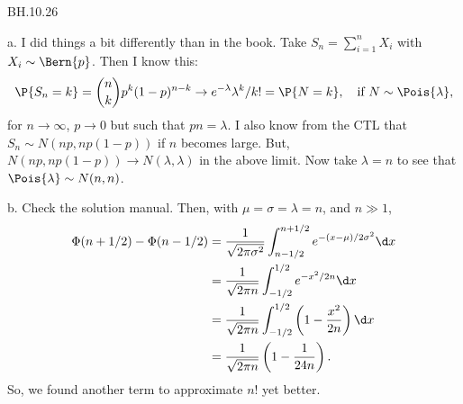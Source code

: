 
\setcounter{theorem}{25}
\begin{exercise} BH.10.26
\begin{solution}
a.
I did things a bit differently than in the book. Take $S_n=\sum_{i=1}^n X_i$ with $X_i\sim\Bern{p}$. Then I know this:
\begin{align*}
\P{S_n=k} = {n \choose k} p^k(1-p)^{n-k} \to e^{-\lambda} \lambda^k/k! = \P{N=k}, \quad\text{if } N\sim\Pois{\lambda},
\end{align*}
for $n\to \infty$, $p\to0$ but such that $p n = \lambda$.
I also know from the CTL that $S_n\sim N(n p, n p(1-p))$ if $n$ becomes large.
But, $N(n p, n p(1-p)) \to N(\lambda, \lambda)$ in the above limit.
Now take $\lambda=n$ to see that $\Pois{\lambda} \sim N(n,n)$.

b.
Check the solution manual. Then, with $\mu=\sigma=\lambda=n$, and $n\gg 1$,
\begin{align*}
\Phi(n+1/2) - \Phi(n-1/2)
&= \frac 1 {\sqrt{2\pi \sigma^{2}}}\int_{n-1/2}^{n+1/2} e^{-(x-\mu)/2\sigma^{2}} \d x\\
&= \frac 1 {\sqrt{2\pi n }}\int_{-1/2}^{1/2} e^{-x^{2}/2n} \d x\\
&= \frac 1 {\sqrt{2\pi n }}\int_{-1/2}^{1/2} \left(1 - \frac{x^{2}}{2n}\right) \d x\\
&= \frac 1 {\sqrt{2\pi n }} \left (1-  \frac{1}{24n}\right ).
\end{align*}
So, we found another term to approximate $n!$ yet better.
\end{solution}
\end{exercise}

